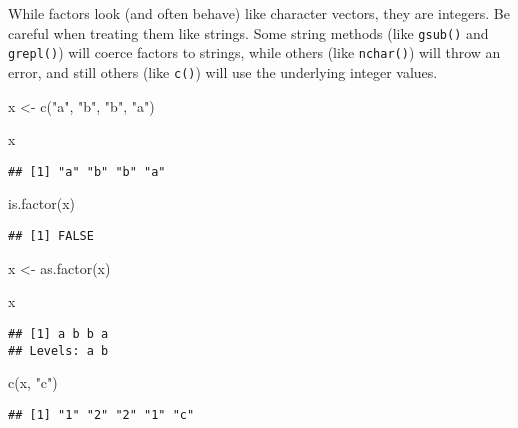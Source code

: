 \documentclass[
]{book}
\newenvironment{Shaded}{\begin{snugshade}}{\end{snugshade}}
\newcommand{\FunctionTok}[1]{\textcolor[rgb]{0.00,0.00,0.00}{#1}}
\newcommand{\NormalTok}[1]{#1}
\newcommand{\OtherTok}[1]{\textcolor[rgb]{0.56,0.35,0.01}{#1}}
\newcommand{\StringTok}[1]{\textcolor[rgb]{0.31,0.60,0.02}{#1}}
\begin{document}
While factors look (and often behave) like character vectors, they are integers. Be careful when treating them like strings. Some string methods (like \texttt{gsub()} and \texttt{grepl()}) will coerce factors to strings, while others (like \texttt{nchar()}) will throw an error, and still others (like \texttt{c()}) will use the underlying integer values.

\begin{Shaded}
\begin{Highlighting}[]
\NormalTok{x }\OtherTok{\textless{}{-}} \FunctionTok{c}\NormalTok{(}\StringTok{"a"}\NormalTok{, }\StringTok{"b"}\NormalTok{, }\StringTok{"b"}\NormalTok{, }\StringTok{"a"}\NormalTok{)}

\NormalTok{x}
\end{Highlighting}
\end{Shaded}

\begin{verbatim}
## [1] "a" "b" "b" "a"
\end{verbatim}

\begin{Shaded}
\begin{Highlighting}[]
\FunctionTok{is.factor}\NormalTok{(x)}
\end{Highlighting}
\end{Shaded}

\begin{verbatim}
## [1] FALSE
\end{verbatim}

\begin{Shaded}
\begin{Highlighting}[]
\NormalTok{x }\OtherTok{\textless{}{-}} \FunctionTok{as.factor}\NormalTok{(x)}

\NormalTok{x}
\end{Highlighting}
\end{Shaded}

\begin{verbatim}
## [1] a b b a
## Levels: a b
\end{verbatim}

\begin{Shaded}
\begin{Highlighting}[]
\FunctionTok{c}\NormalTok{(x, }\StringTok{"c"}\NormalTok{)}
\end{Highlighting}
\end{Shaded}

\begin{verbatim}
## [1] "1" "2" "2" "1" "c"
\end{verbatim}
\end{document}
